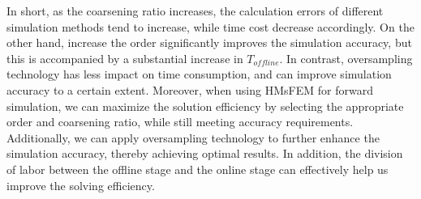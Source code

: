 \documentclass[manuscript,blind]{geophysics}
\begin{document}
In short, as the coarsening ratio increases, the calculation errors of different simulation methods tend to increase, while  time cost decrease accordingly. On the other hand, increase the order significantly improves the simulation accuracy, but this is accompanied by a substantial increase in ${T_{offline}}$. In contrast, oversampling technology has less impact on time consumption, and can improve simulation accuracy to a certain extent. Moreover, when using HMsFEM for forward simulation, we can maximize the solution efficiency by selecting the appropriate order and coarsening ratio, while still meeting accuracy requirements. Additionally, we can apply oversampling technology to further enhance the simulation accuracy, thereby achieving optimal results. In addition, the division of labor between the offline stage and the online stage can effectively help us improve the solving efficiency.
\end{document}
